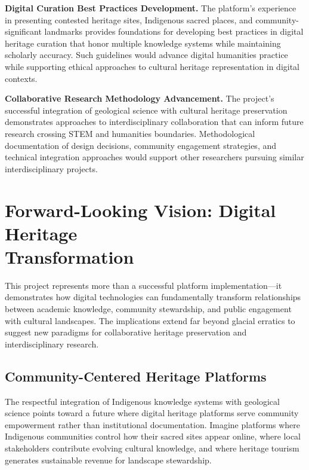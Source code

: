 \textbf{Digital Curation Best Practices Development.} The platform's experience in presenting contested heritage sites, Indigenous sacred places, and community-significant landmarks provides foundations for developing best practices in digital heritage curation that honor multiple knowledge systems while maintaining scholarly accuracy. Such guidelines would advance digital humanities practice while supporting ethical approaches to cultural heritage representation in digital contexts.

\textbf{Collaborative Research Methodology Advancement.} The project's successful integration of geological science with cultural heritage preservation demonstrates approaches to interdisciplinary collaboration that can inform future research crossing STEM and humanities boundaries. Methodological documentation of design decisions, community engagement strategies, and technical integration approaches would support other researchers pursuing similar interdisciplinary projects.

\section{Forward-Looking Vision: Digital Heritage \\ Transformation}
\label{sec:forward_vision}

This project represents more than a successful platform implementation—it demonstrates how digital technologies can fundamentally transform relationships between academic knowledge, community stewardship, and public engagement with cultural landscapes. The implications extend far beyond glacial erratics to suggest new paradigms for collaborative heritage preservation and interdisciplinary research.

\subsection{Community-Centered Heritage Platforms}
\label{subsec:community_heritage}

The respectful integration of Indigenous knowledge systems with geological science points toward a future where digital heritage platforms serve community empowerment rather than institutional documentation. Imagine platforms where Indigenous communities control how their sacred sites appear online, where local stakeholders contribute evolving cultural knowledge, and where heritage tourism generates sustainable revenue for landscape stewardship.

